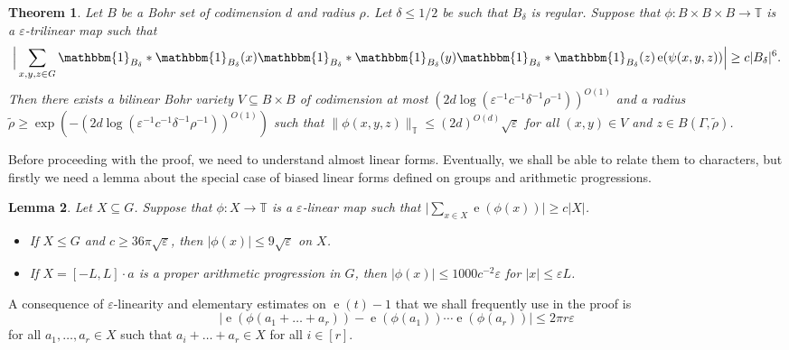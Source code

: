 \documentclass[a4paper,11pt]{article}
\newtheorem{theorem}{Theorem}
\numberwithin{theorem}{section}
\newtheorem{lemma}[theorem]{Lemma}
\theoremstyle{definition}
\newcommand\id{\mathbbm{1}}
\newcommand{\on}[1]{
	\operatorname{#1}
}
\begin{document}
\begin{theorem}\label{equidistributionalmosttrilinearmaps}
    Let $B$ be a Bohr set of codimension $d$ and radius $\rho$. Let $\delta \leq 1/2$ be such that $B_\delta$ is regular. Suppose that $\phi : B \times B \times B \to \mathbb{T}$ is a $\varepsilon$-trilinear map such that 
    \[\Big|\sum_{x,y,z \in G} \id_{B_\delta} \ast \id_{B_\delta}(x) \id_{B_\delta} \ast \id_{B_\delta}(y) \id_{B_\delta} \ast \id_{B_\delta}(z) \on{e}(\psi(x,y,z))\Big| \geq c |B_\delta|^6.\]
    \indent Then there exists a bilinear Bohr variety $V \subseteq B \times B$ of codimension at most $(2d \log(\varepsilon^{-1} c^{-1} \delta^{-1} \rho^{-1}))^{O(1)}$ and a radius $\tilde{\rho} \geq \exp(-(2d \log(\varepsilon^{-1} c^{-1} \delta^{-1}\rho^{-1}))^{O(1)})$ such that $\|\phi(x,y,z)\|_{\mathbb{T}} \leq (2d)^{O(d)} \sqrt{\varepsilon}$ for all $(x,y) \in V$ and $z \in B(\Gamma, \tilde{\rho})$. 
\end{theorem}

Before proceeding with the proof, we need to understand almost linear forms. Eventually, we shall be able to relate them to characters, but firstly we need a lemma about the special case of biased linear forms defined on groups and arithmetic progressions.

\begin{lemma}\label{biasedalmostlinearformstructure}
    Let $X \subseteq G$. Suppose that $\phi : X \to \mathbb{T}$ is a $\varepsilon$-linear map such that $\Big|\sum_{x \in X} \on{e}(\phi(x))\Big| \geq c|X|$. 
    \begin{itemize}
        \item If $X \leq G$ and $c \geq 36 \pi \sqrt{\varepsilon}$, then $|\phi(x)| \leq 9\sqrt{\varepsilon}$ on $X$.
        \item If $X = [-L, L] \cdot a$ is a proper arithmetic progression in $G$, then $|\phi(x)| \leq 1000c^{-2} \varepsilon$ for $|x| \leq \varepsilon L$.
    \end{itemize}
\end{lemma}

A consequence of $\varepsilon$-linearity and elementary estimates on $\on{e}(t) - 1$ that we shall frequently use in the proof is
\[\Big|\on{e}(\phi(a_1 + \dots + a_r)) - \on{e}(\phi(a_1))\cdots \on{e}(\phi(a_r))\Big| \leq 2\pi r \varepsilon\]
for all $a_1, \dots , a_r \in X$ such that $a_i + \dots + a_r \in X$ for all $i \in [r]$.
\end{document}
